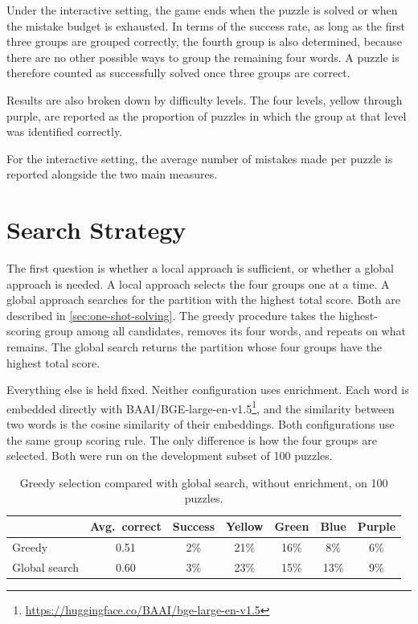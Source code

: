 Under the interactive setting, the game ends when the puzzle is solved or when the mistake budget is exhausted. In terms of the success rate, as long as the first three groups are grouped correctly, the fourth group is also determined, because there are no other possible ways to group the remaining four words. A puzzle is therefore counted as successfully solved once three groups are correct.

Results are also broken down by difficulty levels. The four levels, yellow through purple, are reported as the proportion of puzzles in which the group at that level was identified correctly.

For the interactive setting, the average number of mistakes made per puzzle is reported alongside the two main measures.

\section{Search Strategy}
\label{sec:exp-search}

The first question is whether a local approach is sufficient, or whether a global approach is needed. A local approach selects the four groups one at a time. A global approach searches for the partition with the highest total score. Both are described in \autoref{sec:one-shot-solving}. The greedy procedure takes the highest-scoring group among all candidates, removes its four words, and repeats on what remains. The global search returns the partition whose four groups have the highest total score.

Everything else is held fixed. Neither configuration uses enrichment. Each word is embedded directly with BAAI/BGE-large-en-v1.5\footnote{\url{https://huggingface.co/BAAI/bge-large-en-v1.5}}, and the similarity between two words is the cosine similarity of their embeddings. Both configurations use the same group scoring rule. The only difference is how the four groups are selected. Both were run on the development subset of 100 puzzles.

\begin{table}[t]
\centering
\caption{Greedy selection compared with global search, without enrichment, on 100 puzzles.}
\label{tab:search}
\begin{tabular}{lcccccc}
\toprule
& Avg.\ correct & Success & Yellow & Green & Blue & Purple \\
\midrule
Greedy & 0.51 & 2\% & 21\% & 16\% & 8\% & 6\% \\
Global search & 0.60 & 3\% & 23\% & 15\% & 13\% & 9\% \\
\bottomrule
\end{tabular}
\end{table}

